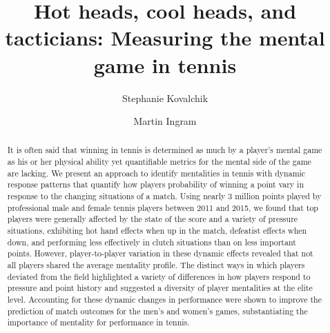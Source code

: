 \documentclass{Latex/svjour3}
\begin{document}
\title{Hot heads, cool heads, and tacticians: Measuring the mental
  game in tennis}



\author{Stephanie Kovalchik\and Martin Ingram}


\date{}


\maketitle

\begin{abstract}
It is often said that winning in tennis is determined as much by a
player's mental game as his or her physical ability yet quantifiable
metrics for the mental side of the game are lacking. We present an
approach to identify mentalities in tennis with dynamic response
patterns that quantify how players probability of winning a point vary
in response to the changing situations of a match. Using nearly 3
million points played by professional male and female tennis players between
2011 and 2015, we found that top players were
generally affected by the state of the score and a variety of pressure
situations, exhibiting hot hand effects when up in the match,
defeatist effects when down, and performing less effectively in clutch
situations than on less important points. However, player-to-player
variation in these dynamic effects revealed that not all players
shared the average mentality profile. The distinct ways in which
players deviated from the field highlighted a variety of differences
in how players respond to pressure and point history and suggested a
diversity of player mentalities at the elite
level. Accounting for these dynamic changes in performance were shown
to improve the prediction of match outcomes for the men's and women's
games, substantiating the importance of mentality for performance in tennis.



\end{abstract}
\end{document}
